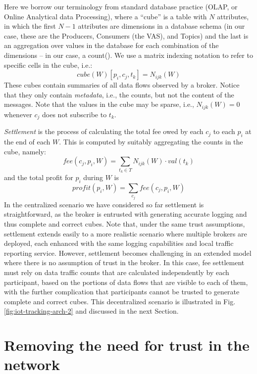 \documentclass[chi_draft]{sigchi}
\begin{document}
Here we borrow our terminology from standard database practice (OLAP, or Online Analytical data Processing), where a  ``cube'' is a table with $ N $ attributes, in which the first $ N-1 $ attributes are  dimensions in a database schema (in our case, these are the Producers, Consumers (the VAS), and Topics) and the last is an aggregation over values in the database for each combination of the dimensions -- in our case, a count().
We use a matrix indexing notation to refer to specific cells in the cube, i.e.:
\[ \mathit{cube}(W)[p_i, c_j, t_k] = N_{ijk}(W) \] 
These cubes contain summaries of all data flows observed by a broker. Notice that they only contain \textit{metadata}, i.e., the counts, but not the content of the messages.
%
Note that the values in the cube may be sparse, i.e., $N_{ijk}(W) = 0$ whenever $c_j$ does not subscribe to $t_k$.

\textit{Settlement} is the process of calculating the total fee owed by each $ c_j $ to each $ p_i $ at the end of each $W$.
This is computed by suitably aggregating the counts in the cube, namely:
\begin{equation}
\mathit{fee}(c_j, p_i, W) = \sum_{t_k \in T} N_{ijk}(W) \cdot \mathit{val}(t_k)
\label{eq:balance}
\end{equation}
and the total profit for $ p_i  $ during $W$ is
\begin{equation}
\mathit{profit}(p_i, W) = \sum_{c_j} \mathit{fee}(c_j, p_i, W)
\label{eq:reward}
\end{equation}
In the centralized scenario we have considered so far settlement is straightforward, as the broker is entrusted with generating accurate logging and thus complete and correct cubes.
Note that, under the same trust assumptions, settlement extends easily to a more realistic scenario where multiple brokers are deployed, each enhanced with the same logging capabilities and local traffic reporting service.
%
However, settlement becomes challenging in an extended model where there is no assumption of trust in the broker.
In this case, fee settlement must rely on data traffic counts that are calculated independently by each participant, based on the portions of data flows that are visible to each of them, with the 
further complication that participants cannot be trusted to generate complete and correct cubes.
This decentralized scenario is illustrated in Fig. \ref{fig:iot-tracking-arch-2} and discussed in the next Section.

\section{Removing the need  for trust in the network}  \label{sec:no-trust}
\end{document}
